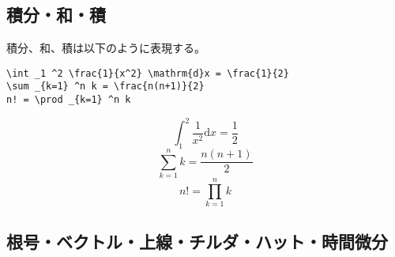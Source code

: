 \subsection{積分・和・積}
\label{sec:latex:integration}

積分、和、積は以下のように表現する。
\begin{reidai}
    \begin{verbatim}
\int _1 ^2 \frac{1}{x^2} \mathrm{d}x = \frac{1}{2}
\sum _{k=1} ^n k = \frac{n(n+1)}{2}
n! = \prod _{k=1} ^n k
\end{verbatim}
\end{reidai}
\vspace*{-1.5em}
\begin{kekka}
    \begin{equation*}
        \int _1 ^2 \frac{1}{x^2} \mathrm{d}x = \frac{1}{2}
    \end{equation*}
    \begin{equation*}
        \sum _{k=1} ^n k = \frac{n(n+1)}{2}
    \end{equation*}
    \begin{equation*}
        n! = \prod _{k=1} ^n k
    \end{equation*}
\end{kekka}

\subsection{根号・ベクトル・上線・チルダ・ハット・時間微分}
\label{sec:latex:root}

